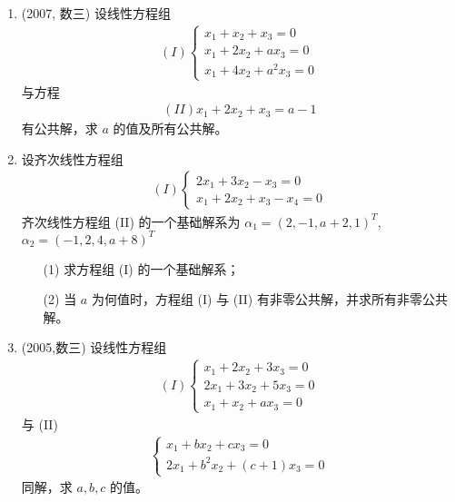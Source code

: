 \documentclass[12pt, a4paper, oneside, UTF8]{ctexbook}
\begin{document}
\begin{enumerate}[label=\arabic*.,start=12]
    \item (2007, 数三) 设线性方程组
    \begin{align*}
    (I) \begin{cases}
    x_1 + x_2 + x_3 = 0 \\
    x_1 + 2x_2 + a x_3 = 0 \\
    x_1 + 4x_2 + a^2 x_3 = 0
    \end{cases}
    \end{align*}
    与方程
    \begin{align*}
    (II) x_1 + 2x_2 + x_3 = a - 1
    \end{align*}
    有公共解，求 $a$ 的值及所有公共解。
    
    \begin{solution}
    \newpage
    \end{solution}
    
    \item 设齐次线性方程组
    \begin{align*}
    (I) \begin{cases}
    2x_1 + 3x_2 - x_3 = 0 \\
    x_1 + 2x_2 + x_3 - x_4 = 0
    \end{cases}
    \end{align*}
    齐次线性方程组 (II) 的一个基础解系为 $\alpha_1 = (2, -1, a+2, 1)^T$, $\alpha_2 = (-1, 2, 4, a+8)^T$ 
    \begin{enumerate}
        \item [(1)] 求方程组 (I) 的一个基础解系；
        \item [(2)] 当 $a$ 为何值时，方程组 (I) 与 (II) 有非零公共解，并求所有非零公共解。
    \end{enumerate}
    
    \begin{solution}
    \newpage
    \end{solution}
    
    \item (2005,数三) 设线性方程组
    \begin{align*}
    (I) \begin{cases}
    x_1 + 2x_2 + 3x_3 = 0 \\
    2x_1 + 3x_2 + 5x_3 = 0 \\
    x_1 + x_2 + a x_3 = 0
    \end{cases}
    \end{align*}
    与 (II) 
    \begin{align*}
    \begin{cases}
    x_1 + b x_2 + c x_3 = 0 \\
    2x_1 + b^2 x_2 + (c+1) x_3 = 0
    \end{cases}
    \end{align*}
    同解，求 $a, b, c$ 的值。
    
    \begin{solution}
    \newpage
    \end{solution}
\end{enumerate}


\ifx\allfiles\undefined
\end{document}
